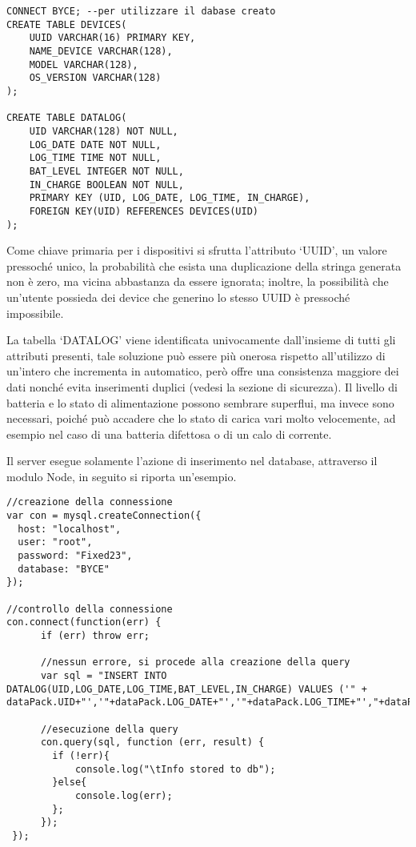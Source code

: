 \documentclass[target=bach]{thud}
\begin{document}
\begin{lstlisting}
CONNECT BYCE; --per utilizzare il dabase creato
CREATE TABLE DEVICES(
    UUID VARCHAR(16) PRIMARY KEY,
    NAME_DEVICE VARCHAR(128),
    MODEL VARCHAR(128),
    OS_VERSION VARCHAR(128)
);

CREATE TABLE DATALOG(
    UID VARCHAR(128) NOT NULL,
    LOG_DATE DATE NOT NULL,
    LOG_TIME TIME NOT NULL,
    BAT_LEVEL INTEGER NOT NULL,
    IN_CHARGE BOOLEAN NOT NULL,
    PRIMARY KEY (UID, LOG_DATE, LOG_TIME, IN_CHARGE),
    FOREIGN KEY(UID) REFERENCES DEVICES(UID)
);
\end{lstlisting}

                Come chiave primaria per i dispositivi si sfrutta l'attributo `UUID', un valore pressoché unico, la probabilità che esista una duplicazione della stringa generata non è zero, ma vicina abbastanza da essere ignorata; inoltre, la possibilità che un'utente possieda dei device che generino lo stesso UUID è pressoché impossibile.

                La tabella `DATALOG' viene identificata univocamente dall'insieme di tutti gli attributi presenti, tale soluzione può essere più onerosa rispetto all'utilizzo di un'intero che incrementa in automatico, però offre una consistenza maggiore dei dati nonché evita inserimenti duplici (vedesi la sezione di sicurezza).
                Il livello di batteria e lo stato di alimentazione possono sembrare superflui, ma invece sono necessari, poiché può accadere che lo stato di carica vari molto velocemente, ad esempio nel caso di una batteria difettosa o di un calo di corrente.

                Il server esegue solamente l'azione di inserimento nel database, attraverso il modulo Node, in seguito si riporta un'esempio.
\begin{lstlisting}
//creazione della connessione
var con = mysql.createConnection({
  host: "localhost",
  user: "root",
  password: "Fixed23",
  database: "BYCE"
});

//controllo della connessione
con.connect(function(err) {
      if (err) throw err;

      //nessun errore, si procede alla creazione della query
      var sql = "INSERT INTO DATALOG(UID,LOG_DATE,LOG_TIME,BAT_LEVEL,IN_CHARGE) VALUES ('" + dataPack.UID+"','"+dataPack.LOG_DATE+"','"+dataPack.LOG_TIME+"',"+dataPack.BAT_LEVEL+","+dataPack.INCHARGE+");";

      //esecuzione della query
      con.query(sql, function (err, result) {
        if (!err){
            console.log("\tInfo stored to db");
        }else{
            console.log(err);
        };
      });
 });

\end{lstlisting}
\end{document}
